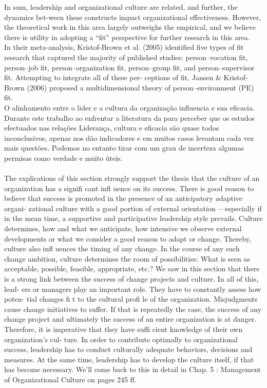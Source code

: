 In sum, leadership and organizational culture are related, and further, the dynamics bet-ween these constructs impact organizational effectiveness. However, the theoretical work in this area largely outweighs the empirical, and we believe there is utility in adopting a “fit” perspective for further research in this area.\\

In their meta-analysis, Kristof-Brown et al. (2005) identified five types of fit research that captured the majority of published studies: person–vocation fit, person–job fit, person–organization fit, person–group fit, and person–supervisor fit. Attempting to integrate all of these per- ceptions of fit, Jansen \& Kristof-Brown (2006) proposed a multidimensional theory of person–environment (PE) fit. \\

O alinhamento entre o lider e a cultura da organização influencia e sua eficacia.\\

Durante este trabalho ao enfrentar a literatura da para perceber que os estudos efectuados nas relações Liderança, cultura e eficacia são quase todos inconclusivos, apenas nos dão indicadores e em muitos casos levantam cada vez mais questões. Podemos no entanto tirar com um grau de incerteza algumas permisas como verdade e muito úteis. \\
\\
The explications of this section strongly support the thesis that the culture of an organization has a signifi cant infl uence on its success. There is good reason to believe that success is promoted in the presence of an anticipatory adaptive organi- zational culture with a good portion of external orientation —especially if in the mean time, a supportive and participative leadership style prevails. Culture determines, how and what we anticipate, how intensive we observe external developments or what we consider a good reason to adapt or change. Thereby, culture also infl uences the timing of any change. In the course of any such change ambition, culture determines the room of possibilities: What is seen as acceptable, possible, feasible, appropriate, etc.? We saw in this section that there is a strong link between the success of change projects and culture. In all of this, lead- ers or managers play an important role. They have to constantly assess how poten- tial changes fi t to the cultural profi le of the organization. Misjudgments cause change initiatives to suffer. If that is repeatedly the case, the success of any change project and ultimately the success of an entire organization is at danger. Therefore, it is imperative that they have suffi cient knowledge of their own organization’s cul- ture. In order to contribute optimally to organizational success, leadership has to conduct culturally adequate behaviors, decisions and measures. At the same time, leadership has to develop the culture itself, if that has become necessary. We’ll come back to this in detail in Chap. 5 : Management of Organizational Culture on pages 245 ff. \\

